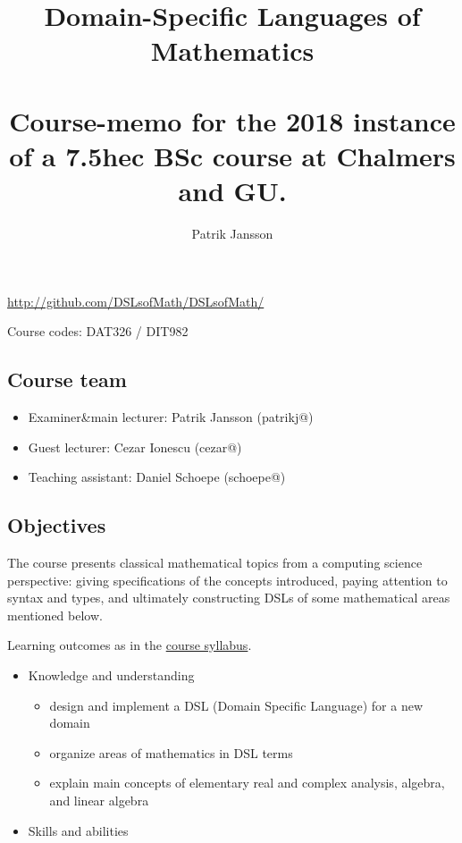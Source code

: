 \documentclass[10pt,a4paper]{article}
\title{Domain-Specific Languages of Mathematics \\\\ \small Course-memo for
the 2018 instance of a 7.5hec BSc course at Chalmers and GU.}
\author{Patrik Jansson}
\begin{document}
\maketitle
\begin{multicols}{2}


\providecommand{\tightlist}{%
  \setlength{\itemsep}{0pt}\setlength{\parskip}{0pt}}

  \url{http://github.com/DSLsofMath/DSLsofMath/}

  Course codes: DAT326 / DIT982

  \subsection{Course team}\label{course-team}

  \begin{itemize}
  \tightlist
  \item
    Examiner\&main lecturer: Patrik Jansson (patrikj@)
  \item
    Guest lecturer: Cezar Ionescu (cezar@)
  \item
    Teaching assistant: Daniel Schoepe (schoepe@)
  \end{itemize}

  \subsection{Objectives}\label{objectives}

  The course presents classical mathematical topics from a computing
  science perspective: giving specifications of the concepts introduced,
  paying attention to syntax and types, and ultimately constructing DSLs
  of some mathematical areas mentioned below.

  Learning outcomes as in the
  \href{https://www.student.chalmers.se/sp/course?course_id=26170}{course
  syllabus}.

  \begin{itemize}
  \tightlist
  \item
    Knowledge and understanding

    \begin{itemize}
    \tightlist
    \item
      design and implement a DSL (Domain Specific Language) for a new
      domain
    \item
      organize areas of mathematics in DSL terms
    \item
      explain main concepts of elementary real and complex analysis,
      algebra, and linear algebra
    \end{itemize}
  \item
    Skills and abilities


\end{itemize}
\end{multicols}
\end{document}
